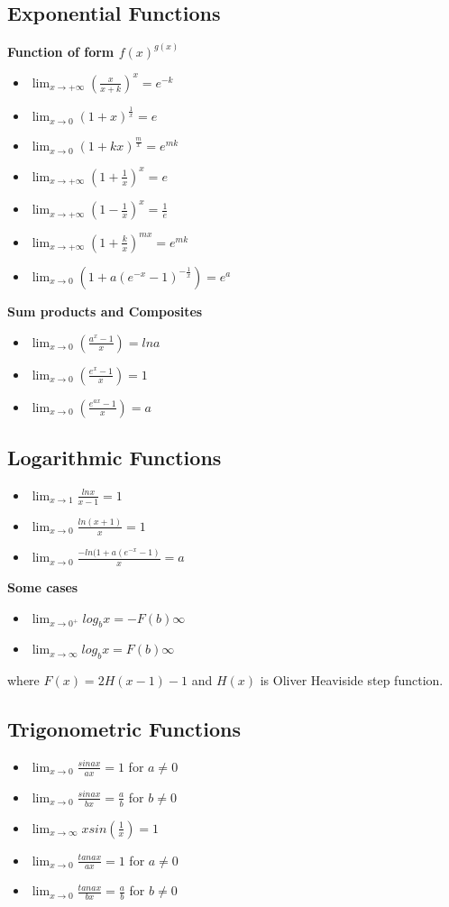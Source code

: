 \documentclass[12pt]{article}
\begin{document}
\subsection{Exponential Functions}
\textbf{Function of form $f(x)^{g(x)}$}
\begin{itemize}
\item $\lim_{x \to + \infty} (\frac{x}{x+k})^x=e^{-k}$
\item $\lim_{x \to 0} (1+x)^\frac{1}{x}=e$
\item $\lim_{x \to 0} (1+kx)^\frac{m}{x}=e^{mk}$
\item $\lim_{x \to + \infty} (1+ \frac{1}{x})^x=e$
\item $\lim_{x \to + \infty} (1- \frac{1}{x})^x=\frac{1}{e}$
\item $\lim_{x \to + \infty} (1+ \frac{k}{x})^{mx}=e^{mk}$
\item $\lim_{x \to 0} (1+ a(e^{-x}-1)^{- \frac{1}{x}})=e^a$
\end{itemize}
\textbf{Sum products and Composites}
\begin{itemize}
\item $\lim_{x \to 0} (\frac{a^x -1}{x})=lna$
\item $\lim_{x \to 0} (\frac{e^x -1}{x})=1$
\item $\lim_{x \to 0} (\frac{e^{ax}-1}{x})=a$
\end{itemize}
\subsection{Logarithmic Functions}
\begin{itemize}
\item $\lim_{x \to 1} \frac{lnx}{x-1}=1$
\item $\lim_{x \to 0} \frac{ln(x+1)}{x}=1$
\item $\lim_{x \to 0} \frac{-ln(1+a(e^{-x}-1)}{x}=a$
\end{itemize}
\textbf{Some cases}
\begin{itemize}
\item $\lim_{x \to 0^+} log_b x=-F(b) \infty$
\item $\lim_{x \to \infty} log_b x=F(b) \infty$
\end{itemize}
where $F(x)=2H(x-1)-1$ and $H(x)$ is Oliver Heaviside step function.
\subsection{Trigonometric Functions}
\begin{itemize}
\item $\lim_{x \to 0} \frac{sinax}{ax}=1 $ for $a \not= 0$
\item $\lim_{x \to 0} \frac{sinax}{bx}=\frac{a}{b} $ for $b \not= 0$
\item $\lim_{x \to \infty} xsin( \frac{1}{x})=1$
\item $\lim_{x \to 0} \frac{tanax}{ax}=1 $ for $a \not= 0$ 
\item $\lim_{x \to 0} \frac{tanax}{bx}=\frac{a}{b} $ for $b \not= 0$
\end{itemize}
\end{document}

